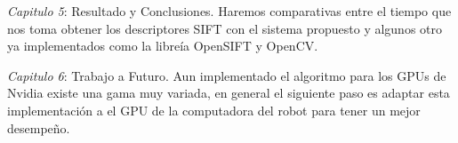 \textit{Capitulo 5}: Resultado y Conclusiones. Haremos comparativas entre el tiempo que nos toma obtener los descriptores SIFT con el sistema propuesto y algunos otro ya implementados como la libreía OpenSIFT y OpenCV.

\textit{Capitulo 6}: Trabajo a Futuro. Aun implementado el algoritmo para los GPUs de Nvidia existe una gama muy variada, en general el siguiente paso es adaptar esta implementación a el GPU de la computadora del robot para tener un mejor desempeño.






